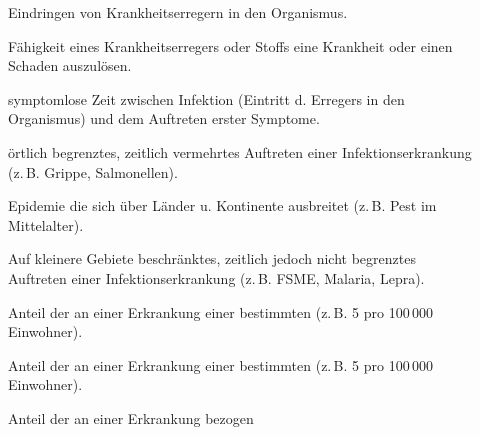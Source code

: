 \begin{description}
  \item[]
  Eindringen von Krankheitserregern in den Organismus.
  \item[] 
  Fähigkeit eines Krankheitserregers oder Stoffs eine
  Krankheit oder einen Schaden auszulösen.
  \item[]
  \item[]
  symptomlose Zeit zwischen Infektion (Eintritt d.
  Erregers in den Organismus) und dem Auftreten erster
  Symptome.
  \item[]
  örtlich begrenztes, zeitlich vermehrtes Auftreten einer 
  Infektionserkrankung (z.\,B. Grippe, Salmonellen).
  \item[]
  Epidemie die sich über Länder u. Kontinente ausbreitet
  (z.\,B. Pest im Mittelalter).
  \item[]
  Auf kleinere Gebiete beschränktes, zeitlich jedoch nicht
  begrenztes Auftreten einer Infektionserkrankung  (z.\,B.
  FSME,
  Malaria, Lepra).
  \item[]
  Anteil der an einer Erkrankung  einer bestimmten
   (z.\,B. 5 pro 100\,000 Einwohner).
  \item[]
  Anteil der an einer Erkrankung  einer
  bestimmten  (z.\,B. 5 pro 100\,000
  Einwohner).
  \item[]
  Anteil der  an einer Erkrankung  bezogen

\end{description}
